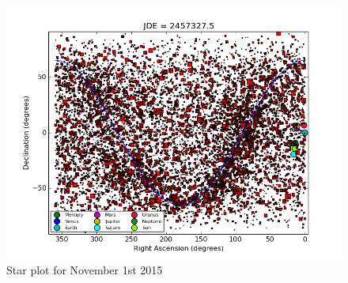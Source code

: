 \documentclass[11pt, leqno]{article}
\begin{document}
\begin{figure}[h!]
    \centering
    \includegraphics[width=\textwidth]{nov_1_2015_jde_jde_2457327.png}
    \caption{Star plot for November 1st 2015}
    \label{fig:november1}
\end{figure}
\end{document}
